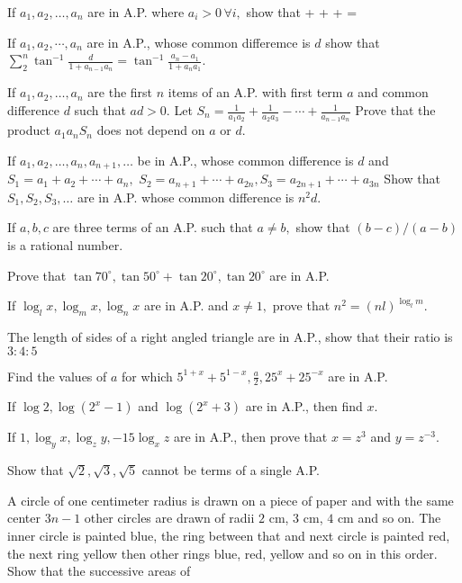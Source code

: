 \item If $a_1, a_2, \ldots, a_n$ are in A.P. where $a_i > 0\,\forall i,$ show that \startformula {} +
   + \cdots +  = \stopformula
\item If $a_1, a_2, \cdots, a_n$ are in A.P., whose common differemce is $d$ show that $\displaystyle\sum_{2}^n\tan^{-1}\frac{d}{1 +
  a_{n - 1}a_n} = \tan^{-1}\frac{a_n - a_1}{1 + a_na_1}$.
\item If $a_1, a_2, \ldots, a_n$ are the first $n$ items of an A.P. with first term $a$ and common difference $d$ such
  that $ad > 0.$ Let $S_n = \frac{1}{a_1a_2} + \frac{1}{a_2a_3} - \cdots + \frac{1}{a_{n - 1}a_n}$ Prove that the product
  $a_1a_nS_n$ does not depend on $a$ or $d$.
\item If $a_1, a_2, \ldots, a_n, a_{n + 1}, \ldots$ be in A.P., whose common difference is $d$ and $S_1 = a_1 + a_2 +
  \cdots + a_n,$ $S_2 = a_{n + 1} + \cdots + a_{2n}, S_3 = a_{2n + 1} + \cdots + a_{3n}$ Show that $S_1, S_2, S_3, \ldots$ are in
  A.P. whose common difference is $n^2d$.
\item If $a, b, c$ are three terms of an A.P. such that $a\neq b,$ show that $(b - c)/(a - b)$ is a rational number.
\item Prove that $\tan 70^\circ, \tan 50^\circ + \tan 20^\circ, \tan 20^\circ$ are in A.P.
\item If $\log_l x, \log_m x, \log_n x$ are in A.P. and $x \neq 1,$ prove that $n^2 = (nl)^{\log_l m}$.
\item The length of sides of a right angled triangle are in A.P., show that their ratio is $3:4:5$
\item Find the values of $a$ for which $5^{1 + x} + 5^{1 - x}, \frac{a}{2}, 25^x + 25^{-x}$ are in A.P.
\item If $\log 2, \log(2^x - 1)$ and $\log(2^x + 3)$ are in A.P., then find $x$.
\item If $1, \log_y x, \log_zy, -15\log_xz$ are in A.P., then prove that $x = z^3$ and $y = z^{-3}$.
\item Show that $\sqrt{2}, \sqrt{3}, \sqrt{5}$ cannot be terms of a single A.P.
\item A circle of one centimeter radius is drawn on a piece of paper and with the same center $3n - 1$ other circles are
  drawn of radii $2$ cm, $3$ cm, $4$ cm and so on. The inner circle is painted blue, the ring between that and next circle is
  painted red, the next ring yellow then other rings blue, red, yellow and so on in this order. Show that the successive areas of
